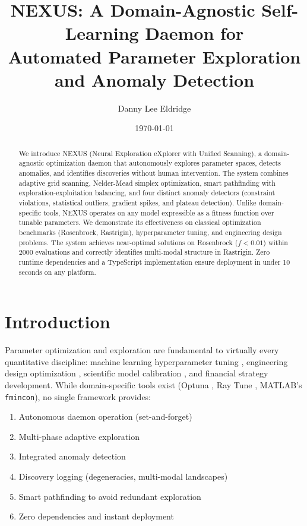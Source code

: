 \documentclass[twocolumn,prd,nofootinbib]{revtex4-2}
\begin{document}
\title{NEXUS: A Domain-Agnostic Self-Learning Daemon for\\Automated Parameter Exploration and Anomaly Detection}

\author{Danny Lee Eldridge}

\date{\today}

\begin{abstract}
We introduce \textsc{NEXUS} (Neural Exploration eXplorer with Unified Scanning), a domain-agnostic optimization daemon that autonomously explores parameter spaces, detects anomalies, and identifies discoveries without human intervention. The system combines adaptive grid scanning, Nelder-Mead simplex optimization, smart pathfinding with exploration-exploitation balancing, and four distinct anomaly detectors (constraint violations, statistical outliers, gradient spikes, and plateau detection). Unlike domain-specific tools, \textsc{NEXUS} operates on any model expressible as a fitness function over tunable parameters. We demonstrate its effectiveness on classical optimization benchmarks (Rosenbrock, Rastrigin), hyperparameter tuning, and engineering design problems. The system achieves near-optimal solutions on Rosenbrock ($f < 0.01$) within 2000 evaluations and correctly identifies multi-modal structure in Rastrigin. Zero runtime dependencies and a TypeScript implementation ensure deployment in under 10 seconds on any platform.
\end{abstract}

\maketitle

\section{Introduction}

Parameter optimization and exploration are fundamental to virtually every quantitative discipline: machine learning hyperparameter tuning \cite{bergstra2012}, engineering design optimization \cite{deb2002}, scientific model calibration \cite{kennedy2001}, and financial strategy development. While domain-specific tools exist (Optuna \cite{optuna}, Ray Tune \cite{raytune}, MATLAB's \texttt{fmincon}), no single framework provides:

\begin{enumerate}
    \item Autonomous daemon operation (set-and-forget)
    \item Multi-phase adaptive exploration
    \item Integrated anomaly detection
    \item Discovery logging (degeneracies, multi-modal landscapes)
    \item Smart pathfinding to avoid redundant exploration
    \item Zero dependencies and instant deployment
\end{enumerate}
\end{document}
